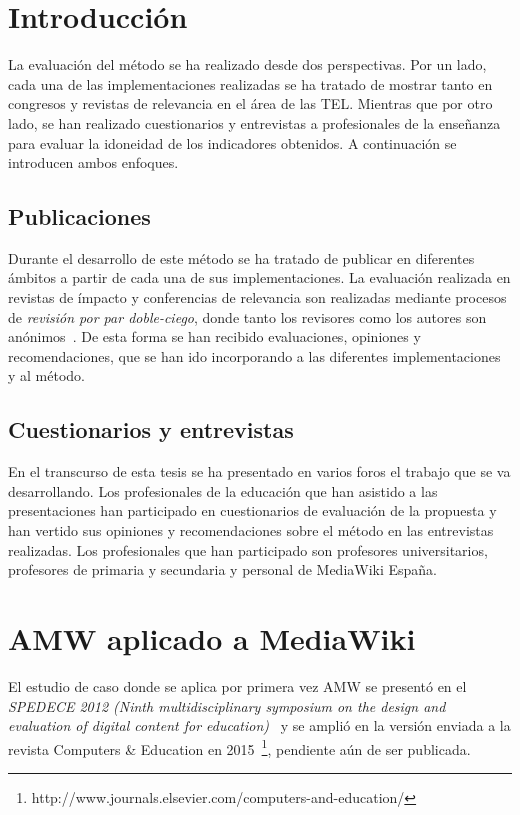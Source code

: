 \section{Introducción}

La evaluación del método se ha realizado desde dos perspectivas. Por un lado, cada una de las implementaciones realizadas se ha tratado de mostrar tanto en congresos y revistas de relevancia en el área de las TEL. Mientras que por otro lado, se han realizado cuestionarios y entrevistas a profesionales de la enseñanza para evaluar la idoneidad de los indicadores obtenidos. A continuación se introducen ambos enfoques.

\subsection{Publicaciones}

Durante el desarrollo de este método se ha tratado de publicar en diferentes ámbitos a partir de cada una de sus implementaciones. La evaluación realizada en revistas de ímpacto y conferencias de relevancia son realizadas mediante procesos de \emph{revisión por par doble-ciego}, donde tanto los revisores como los autores son anónimos~\cite{ladron2008revision}. De esta forma se han recibido evaluaciones, opiniones y recomendaciones, que se han ido incorporando a las diferentes implementaciones y al método.

\subsection{Cuestionarios y entrevistas}

En el transcurso de esta tesis se ha presentado en varios foros el trabajo que se va desarrollando. Los profesionales de la educación que han asistido a las presentaciones han participado en cuestionarios de evaluación de la propuesta y han vertido sus opiniones y recomendaciones sobre el método en las entrevistas realizadas. Los profesionales que han participado son profesores universitarios, profesores de primaria y secundaria y personal de MediaWiki España.

\section{AMW aplicado a MediaWiki}

El estudio de caso donde se aplica por primera vez AMW se presentó en el \emph{SPEDECE 2012 (Ninth multidisciplinary symposium on the design and evaluation of digital content for education)}~\cite{Balderas:2012} y se amplió en la versión enviada a la revista Computers \& Education en 2015~\footnote{http://www.journals.elsevier.com/computers-and-education/}, pendiente aún de ser publicada.

